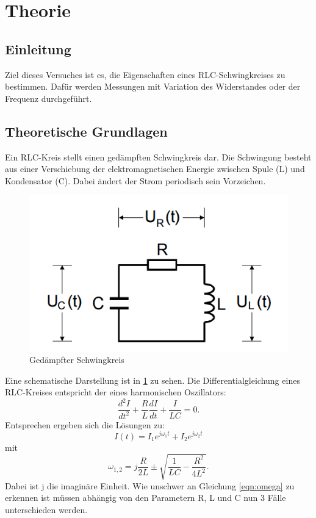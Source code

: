 \section{Theorie}
\label{sec:Theorie}

\subsection{Einleitung}
Ziel dieses Versuches ist es, die Eigenschaften eines RLC-Schwingkreises
zu bestimmen. Dafür werden Messungen mit Variation des Widerstandes oder der
Frequenz durchgeführt.

\subsection{Theoretische Grundlagen}
Ein RLC-Kreis stellt einen gedämpften Schwingkreis dar. Die Schwingung besteht
aus einer Verschiebung der elektromagnetischen Energie zwischen
Spule (L) und Kondensator (C).
Dabei ändert der Strom periodisch sein
Vorzeichen.
\begin{figure}
  \centering
  \includegraphics{schwingkreis.png}
  \caption{Gedämpfter Schwingkreis}
  \label{fig:RLC}
\end{figure}
Eine schematische Darstellung ist in \ref{fig:RLC} zu sehen.
Die Differentialgleichung eines RLC-Kreises entspricht der eines harmonischen
Oszillators:
\begin{equation}
   \frac{d^2I}{dt^2} + \frac{R}{L} \frac{dI}{dt} + \frac{I}{LC} = 0.
   \label{eqn:dgl}
\end{equation}
Entsprechen ergeben sich die Lösungen zu:
\begin{equation}
  I(t) = I_1 e^{j\omega_1t} + I_2 e^{j\omega_2t}
  \label{eqn:I}
\end{equation}
  mit
\begin{equation}
  \omega_{1,2} = j\frac{R}{2L} \pm \sqrt{\frac{1}{LC} - \frac{R^2}{4L^2}}.
  \label{eqn:omega}
\end{equation}
Dabei ist j die imaginäre Einheit.
Wie unschwer an Gleichung \ref{eqn:omega} zu erkennen ist müssen abhängig von
den Parametern R, L und C nun 3 Fälle unterschieden werden.

